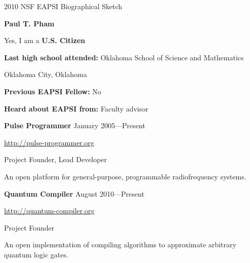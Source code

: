 \documentclass[letter]{article}
\begin{document}
\thispagestyle{empty}           %

\reversemarginpar		%

{\LARGE {2010 NSF EAPSI Biographical Sketch}}
\par
{\Large {\bf Paul T. Pham}}
\par
\vspace{.25in}
				
Yes, I am a {\bf U.S. Citizen} 
\par
{\bf Last high school attended:}
Oklahoma School of Science and Mathematics
\par
Oklahoma City,
Oklahoma
\par
{\bf Previous EAPSI Fellow:} No
\par
{\bf Heard about EAPSI from:}
Faculty advisor
\par
\vspace{\baselineskip}
\par

{\bf Pulse Programmer} \hspace*{\fill}January 2005---Present
\par
\url{http://pulse-programmer.org}
\par
Project Founder, Lead Developer
\par
An open platform for general-purpose, programmable radiofrequency systems.
\vspace{\baselineskip}
\par

{\bf Quantum Compiler} \hspace*{\fill}August 2010---Present
\par
\url{http://quantum-compiler.org}
\par
Project Founder
\par
An open implementation of compiling algorithms to approximate arbitrary quantum
logic gates.
\par
\vspace{\baselineskip}
\par
\end{document}
